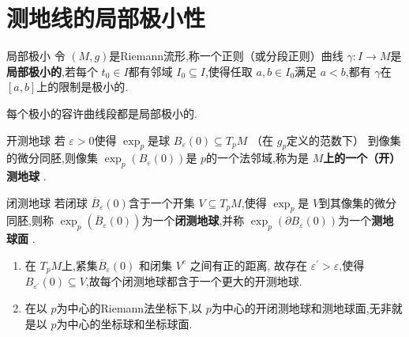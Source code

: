 \documentclass[../../几何与拓扑.tex]{subfiles}
\begin{document}
\section{测地线的局部极小性}

\begin{definition}{局部极小}
    令 \(  \left( M,g \right)   \)是Riemann流形,称一个正则（或分段正则）曲线 \(   \gamma :I\to M  \)是\textbf{局部极小的},若每个 \(  t_0 \in I  \)都有邻域 \(  I_0\subseteq I  \),使得任取 \(  a,b \in I_0  \)满足 \(  a<b  \),都有 \(   \gamma   \)在 \(  \left[ a,b \right]   \)上的限制是极小的.      
\end{definition}

\begin{remark}
    每个极小的容许曲线段都是局部极小的.
\end{remark}

\begin{definition}{开测地球}
    若 \(   \varepsilon > 0  \)使得 \(  \exp _{p}  \)是球 \(  B_{ \varepsilon }\left( 0 \right)\subseteq T_{p}M   \)   （在 \(  g_{p}  \)定义的范数下） 到像集的微分同胚,则像集 \(  \exp _{p}\left( B_{ \varepsilon }\left( 0 \right)  \right)   \)是 \(  p  \)的一个法邻域,称为是  \textbf{\(  M  \)上的一个（开）测地球 }.  
\end{definition}

\begin{definition}{闭测地球}
    若闭球 \(  \overline{B}_{ \varepsilon }\left( 0 \right)   \)含于一个开集 \(  V\subseteq T_{p}M  \),使得 \(  \exp _{p}  \)是 \(  V  \)到其像集的微分同胚,则称 \(  \exp _{p}\left( \overline{B}_{ \varepsilon }\left( 0 \right)  \right)   \)为一个\textbf{闭测地球},并称 \(  \exp _{p}\left( \partial B_{ \varepsilon }\left( 0 \right)  \right)   \)为一个\textbf{测地球面} .     
\end{definition}
\begin{remark}
    \begin{enumerate}
        \item 在 \(  T_{p}M  \)上,紧集\(  \overline{B}_{ \varepsilon }\left( 0 \right)   \) 和闭集 \(  V^{c}  \) 之间有正的距离, 故存在 \(   \varepsilon ^{\prime} >  \varepsilon   \),使得 \(  B_{ \varepsilon ^{\prime} }\left( 0 \right)\subseteq V   \),故每个闭测地球都含于一个更大的开测地球.
        \item 在以 \(  p  \)为中心的Riemann法坐标下,以 \(  p  \)为中心的开闭测地球和测地球面,无非就是以 \(  p  \)为中心的坐标球和坐标球面.   
    \end{enumerate}
      
\end{remark}
\end{document}
